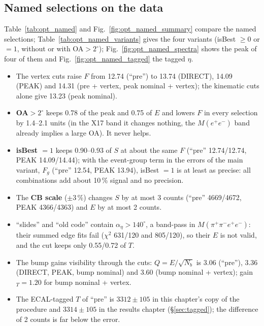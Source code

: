 \documentclass[11pt,a4paper]{article}
\newcommand{\Mfour}{\ensuremath{M(\pi^{+}\pi^{-}e^{+}e^{-})}\xspace}
\newcommand{\Mee}{\ensuremath{M(e^{+}e^{-})}\xspace}
\newcommand{\aeta}{\ensuremath{\alpha_\eta}\xspace}
\begin{document}
\subsection{Named selections on the data}
\label{sec:named}
Table~\ref{tab:opt_named} and Fig.~\ref{fig:opt_named_summary} compare the named selections;
Table~\ref{tab:opt_named_variants} gives the four variants (isBest $\ge0$ or $=1$, without or with OA$>2^\circ$);
Fig.~\ref{fig:opt_named_spectra} shows the peak of four of them and Fig.~\ref{fig:opt_named_tagged} the tagged $\eta$.
\begin{itemize}
\setlength{\itemsep}{0pt}
\item The vertex cuts raise $F$ from 12.74 (``pre'') to 13.74 (DIRECT), 14.09 (PEAK) and 14.31 (pre + vertex, peak
      nominal + vertex); the kinematic cuts alone give 13.23 (peak nominal).
\item \textbf{OA$>2^\circ$} keeps 0.78 of the peak and 0.75 of $E$ and lowers $F$ in every selection by 1.4--2.1 units
      (in the X17 band it changes nothing, the \Mee band already implies a large OA). It never helps.
\item \textbf{isBest $=1$} keeps 0.90--0.93 of $S$ at about the same $F$ (``pre'' 12.74/12.74, PEAK 14.09/14.44); with the
      event-group term in the errors of the main variant, $F_g$ (``pre'' 12.54, PEAK 13.94), isBest $=1$ is at least as
      precise: all combinations add about 10\,\% signal and no precision.
\item The \textbf{CB scale} ($\pm3$\,\%) changes $S$ by at most 3 counts (``pre'' 4669/4672, PEAK 4366/4363) and $E$ by at
      most 2 counts.
\item ``slides'' and ``old code'' contain $\aeta>140^\circ$, a band-pass in \Mfour: their summed edge fits fail
      ($\chi^2$ 631/120 and 805/120), so their $E$ is not valid, and the cut keeps only 0.55/0.72 of $T$.
\item The bump gains visibility through the cuts: $Q=E/\sqrt{N_b}$ is 3.06 (``pre''), 3.36 (DIRECT, PEAK, bump
      nominal) and 3.60 (bump nominal + vertex); gain$_T=1.20$ for bump nominal + vertex.
\item The ECAL-tagged $T$ of ``pre'' is $3312\pm105$ in this chapter's copy of the procedure and $3314\pm105$ in the
      results chapter (\S\ref{sec:tagged}); the difference of 2 counts is far below the error.
\end{itemize}




\end{document}
